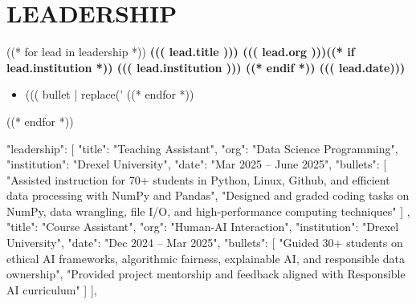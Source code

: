\vspace{-0.4cm}
\section*{LEADERSHIP}
\vspace{-0.1cm}
((* for lead in leadership *))
\noindent
\textbf{((( lead.title ))) \textbar{} ((( lead.org )))((* if lead.institution *)) \textbar{} ((( lead.institution ))) ((* endif *)) \hfill ((( lead.date)))} \\
\vspace{-0.4cm}
\begin{itemize}[leftmargin=0.6cm, itemsep=-0.1cm, topsep=0cm]
((* for bullet in lead.bullets *))
    \item ((( bullet | replace('%
((* endfor *))
\end{itemize}
((* endfor *))


  "leadership": [
    {
      "title": "Teaching Assistant",
      "org": "Data Science Programming",
      "institution": "Drexel University",
      "date": "Mar 2025 -- June 2025",
      "bullets": [
        "Assisted instruction for 70+ students in Python, Linux, Github, and efficient data processing with NumPy and Pandas",
        "Designed and graded coding tasks on  NumPy, data wrangling, file I/O, and high-performance computing techniques"
      ]
    },
    {
      "title": "Course Assistant",
      "org": "Human-AI Interaction",
      "institution": "Drexel University",
      "date": "Dec 2024 -- Mar 2025",
      "bullets": [
        "Guided 30+ students on ethical AI frameworks, algorithmic fairness, explainable AI, and responsible data ownership",
        "Provided project mentorship and feedback aligned with Responsible AI curriculum"
      ]
    }
  ],